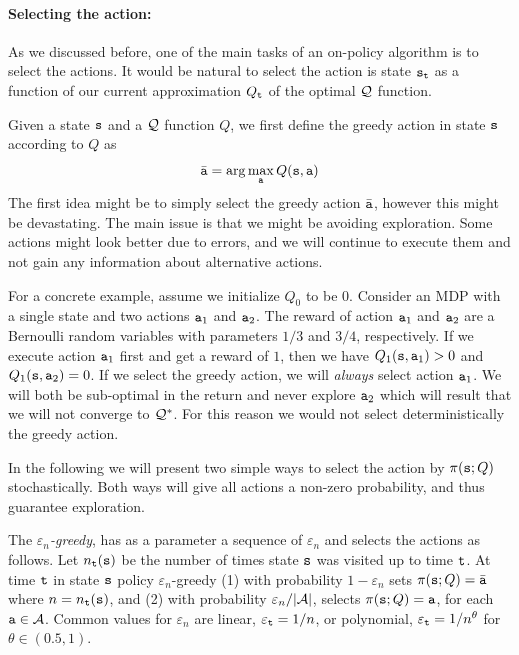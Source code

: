 \paragraph{Selecting the action:}
As we discussed before, one of the main tasks of an on-policy
algorithm is to select the actions. It would be natural to select
the action is state ${\tt s}_{\tt t}$ as a function of our current
approximation $Q_{\tt t}$ of the optimal $\mathcal{Q}$ function.

Given a state ${\tt s}$ and a $\mathcal{Q}$ function $Q$, we first define the
greedy action in state ${\tt s}$ according to $Q$ as
\[
\bar{{\tt a}}=\arg\max_{\tt a} Q({\tt s},{\tt a})
\]
The first idea might be to simply select the greedy action
$\bar{{\tt a}}$, however this might be devastating. The main issue
is that we might be avoiding exploration. Some actions might look better
due to errors, and we will continue to execute them and not gain any
information about alternative actions.


For a concrete example, assume we initialize $Q_0$ to be $0$.
Consider an MDP with a single state and two actions ${\tt a}_1$ and
${\tt a}_2$. The reward of action ${\tt a}_1$ and ${\tt a}_2$ are a
Bernoulli random variables with parameters $1/3$ and $3/4$,
respectively. If we execute action ${\tt a}_1$ first and get a
reward of $1$, then we have $Q_1({\tt s},{\tt a}_1)>0$ and
$Q_1({\tt s},{\tt a}_2)=0$. If we select the greedy action, we will
\emph{always} select action ${\tt a}_1$. We will both be sub-optimal
in the return and never explore ${\tt a}_2$ which will result that
we will not converge to $\mathcal{Q}^*$. For this reason we would not select
deterministically the greedy action.


In the following we will present two simple ways to select the
action by $\pi({\tt s};Q)$ stochastically. Both ways will give
all actions a non-zero probability, and thus guarantee exploration.

The \emph{ $\varepsilon_n$-greedy}, has as a parameter a sequence of
$\varepsilon_n$ and selects the actions as follows. Let
$n_{\tt t}({\tt s})$ be the number of times state ${\tt s}$ was visited
up to time ${\tt t}$. At time ${\tt t}$ in state ${\tt s}$ policy
$\varepsilon_n$-greedy (1) with probability $1-\varepsilon_n$ sets
$\pi({\tt s};Q)=\bar{{\tt a}}$ where $n=n_{\tt t}({\tt s})$, and
(2) with probability $\varepsilon_n/|\mathcal{A}|$, selects
$\pi({\tt s};Q)={\tt a}$, for each ${\tt a} \in \mathcal{A}$. Common
values for $\varepsilon_n$ are linear, $\varepsilon_{\tt t}=1/n$, or
polynomial, $\varepsilon_{\tt t}=1/n^\theta$ for $\theta\in(0.5,1)$.

